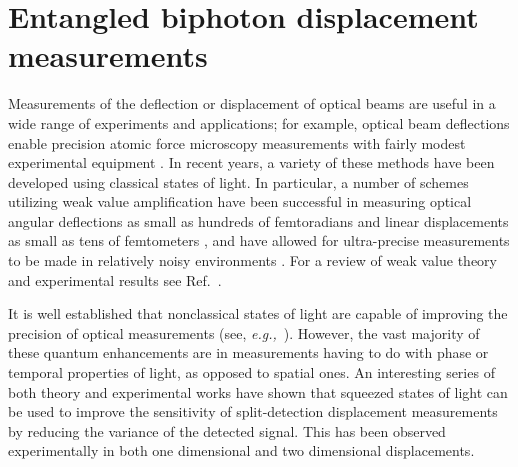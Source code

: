 \chapter[Biphoton displacement measurements]{Entangled biphoton displacement measurements}\label{ch:biphotons}
Measurements of the deflection or displacement of optical beams are useful in a wide range of experiments and applications; for example, optical beam deflections enable precision atomic force microscopy measurements with fairly modest experimental equipment \cite{Putnam1992}.  
In recent years, a variety of these methods have been developed using classical states of light.  
In particular, a number of schemes utilizing weak value amplification have been successful in measuring optical angular deflections as small as hundreds of femtoradians and linear displacements as small as tens of femtometers \cite{Dixon2009}, and have allowed for ultra-precise measurements to be made in relatively noisy environments \cite{Hosten2008}. 
For a review of weak value theory and experimental results see Ref.~\cite{Dressel2014}. 

It is well established that nonclassical states of light are capable of improving the precision of optical measurements (see, \emph{e.g.,}~\cite{Agarwal2013,giovannetti2006}).  
However, the vast majority of these quantum enhancements are in measurements having to do with phase or temporal properties of light, as opposed to spatial ones.  
An interesting series of both theory and experimental works \cite{Fabre2000, Treps2002, Treps2003, Barnett2003} have shown that squeezed states of light can be used to improve the sensitivity of split-detection displacement measurements by reducing the variance of the detected signal.  
This has been observed experimentally in both one dimensional \cite{Treps2002} and two dimensional \cite{Treps2003} displacements. 

